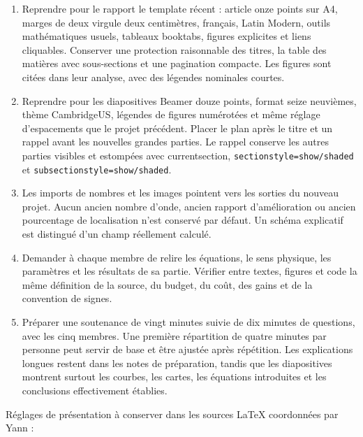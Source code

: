 \documentclass[11pt,a4paper]{article}
\begin{document}
\begin{enumerate}
\item Reprendre pour le rapport le template récent : article onze points sur A4, marges de deux virgule deux centimètres, français, Latin Modern, outils mathématiques usuels, tableaux {\small\ttfamily booktabs}, figures explicites et liens cliquables. Conserver une protection raisonnable des titres, la table des matières avec sous-sections et une pagination compacte. Les figures sont citées dans leur analyse, avec des légendes nominales courtes.
\item Reprendre pour les diapositives Beamer douze points, format seize neuvièmes, thème {\small\ttfamily CambridgeUS}, légendes de figures numérotées et même réglage d'espacements que le projet précédent. Placer le plan après le titre et un rappel avant les nouvelles grandes parties. Le rappel conserve les autres parties visibles et estompées avec {\small\ttfamily currentsection}, {\small\ttfamily \nolinkurl{sectionstyle=show/shaded}} et {\small\ttfamily \nolinkurl{subsectionstyle=show/shaded}}.
\item Les imports de nombres et les images pointent vers les sorties du nouveau projet. Aucun ancien nombre d'onde, ancien rapport d'amélioration ou ancien pourcentage de localisation n'est conservé par défaut. Un schéma explicatif est distingué d'un champ réellement calculé.
\item Demander à chaque membre de relire les équations, le sens physique, les paramètres et les résultats de sa partie. Vérifier entre textes, figures et code la même définition de la source, du budget, du coût, des gains et de la convention de signes.
\item Préparer une soutenance de vingt minutes suivie de dix minutes de questions, avec les cinq membres. Une première répartition de quatre minutes par personne peut servir de base et être ajustée après répétition. Les explications longues restent dans les notes de préparation, tandis que les diapositives montrent surtout les courbes, les cartes, les équations introduites et les conclusions effectivement établies.
\end{enumerate}

Réglages de présentation à conserver dans les sources LaTeX coordonnées par Yann :
\end{document}
